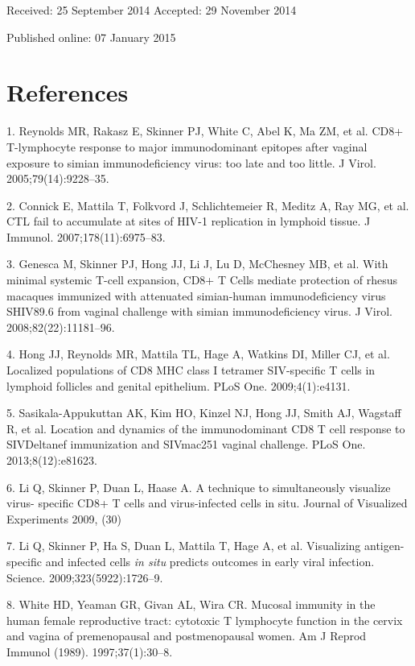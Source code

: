 \documentclass{article}
\begin{document}
Received: 25 September 2014 Accepted: 29 November 2014

Published online: 07 January 2015

\section*{References}

\begin{hangpars}
1. Reynolds MR, Rakasz E, Skinner PJ, White C, Abel K, Ma ZM, et al. CD8+ T-lymphocyte response to major immunodominant epitopes after vaginal exposure to simian immunodeficiency virus: too late and too little. J Virol. 2005;79(14):9228–35.

2. Connick E, Mattila T, Folkvord J, Schlichtemeier R, Meditz A, Ray MG, et al. CTL fail to accumulate at sites of HIV-1 replication in lymphoid tissue. J Immunol. 2007;178(11):6975–83.

3. Genesca M, Skinner PJ, Hong JJ, Li J, Lu D, McChesney MB, et al. With minimal systemic T-cell expansion, CD8+ T Cells mediate protection of rhesus macaques immunized with attenuated simian-human immunodeficiency virus SHIV89.6 from vaginal challenge with simian immunodeficiency virus. J Virol. 2008;82(22):11181–96.

4. Hong JJ, Reynolds MR, Mattila TL, Hage A, Watkins DI, Miller CJ, et al. Localized populations of CD8 MHC class I tetramer SIV-specific T cells in lymphoid follicles and genital epithelium. PLoS One. 2009;4(1):e4131.

5. Sasikala-Appukuttan AK, Kim HO, Kinzel NJ, Hong JJ, Smith AJ, Wagstaff R, et al. Location and dynamics of the immunodominant CD8 T cell response to SIVDeltanef immunization and SIVmac251 vaginal challenge. PLoS One. 2013;8(12):e81623.

6. Li Q, Skinner P, Duan L, Haase A. A technique to simultaneously visualize virus- specific CD8+ T cells and virus-infected cells in situ. Journal of Visualized Experiments 2009, (30)

7. Li Q, Skinner P, Ha S, Duan L, Mattila T, Hage A, et al. Visualizing antigen-specific and infected cells \textit{in situ} predicts outcomes in early viral infection. Science. 2009;323(5922):1726–9.

8. White HD, Yeaman GR, Givan AL, Wira CR. Mucosal immunity in the human female reproductive tract: cytotoxic T lymphocyte function in the cervix and vagina of premenopausal and postmenopausal women. Am J Reprod Immunol (1989). 1997;37(1):30–8.


\end{hangpars}
\end{document}
